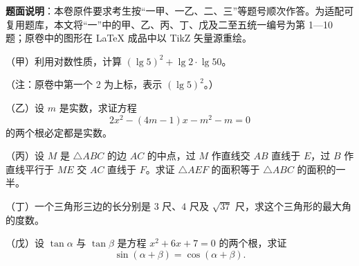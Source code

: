 

\begin{gktip}
\textbf{题面说明}：本卷原件要求考生按“一甲、一乙、二、三”等题号顺次作答。为适配可复用题库，本文将“一”中的甲、乙、丙、丁、戊及二至五统一编号为第 1—10 题；原卷中的图形在 LaTeX 成品中以 TikZ 矢量源重绘。
\end{gktip}


\begin{question}
（甲）利用对数性质，计算 $(\lg 5)^2+\lg 2\cdot\lg 50$。

（注：原卷中第一个 2 为上标，表示 $(\lg 5)^2$。）

\end{question}
\begin{question}
（乙）设 $m$ 是实数，求证方程
\nopagebreak[4]
\[
2x^2-(4m-1)x-m^2-m=0
\]
的两个根必定都是实数。

\end{question}
\begin{question}
（丙）设 $M$ 是 $\triangle ABC$ 的边 $AC$ 的中点，过 $M$ 作直线交 $AB$ 直线于 $E$，过 $B$ 作直线平行于 $ME$ 交 $AC$ 直线于 $F$。求证 $\triangle AEF$ 的面积等于 $\triangle ABC$ 的面积的一半。

\end{question}
\begin{question}
（丁）一个三角形三边的长分别是 $3$ 尺、$4$ 尺及 $\sqrt{37}$ 尺，求这个三角形的最大角的度数。

\end{question}
\begin{question}
（戊）设 $\tan\alpha$ 与 $\tan\beta$ 是方程 $x^2+6x+7=0$ 的两个根，求证
\nopagebreak[4]
\[
\sin(\alpha+\beta)=\cos(\alpha+\beta).
\]

\end{question}

